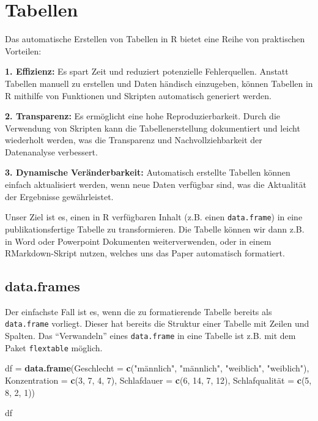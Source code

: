 \documentclass[
]{book}
\newenvironment{Shaded}{\begin{snugshade}}{\end{snugshade}}
\newcommand{\AttributeTok}[1]{\textcolor[rgb]{0.13,0.29,0.53}{#1}}
\newcommand{\DecValTok}[1]{\textcolor[rgb]{0.00,0.00,0.81}{#1}}
\newcommand{\FunctionTok}[1]{\textcolor[rgb]{0.13,0.29,0.53}{\textbf{#1}}}
\newcommand{\NormalTok}[1]{#1}
\newcommand{\OtherTok}[1]{\textcolor[rgb]{0.56,0.35,0.01}{#1}}
\newcommand{\StringTok}[1]{\textcolor[rgb]{0.31,0.60,0.02}{#1}}
\begin{document}
\chapter{Tabellen}\label{tabellen}

Das automatische Erstellen von Tabellen in R bietet eine Reihe von praktischen Vorteilen:

\textbf{1. Effizienz:} Es spart Zeit und reduziert potenzielle Fehlerquellen. Anstatt Tabellen manuell zu erstellen und Daten händisch einzugeben, können Tabellen in R mithilfe von Funktionen und Skripten automatisch generiert werden.

\textbf{2. Transparenz:} Es ermöglicht eine hohe Reproduzierbarkeit. Durch die Verwendung von Skripten kann die Tabellenerstellung dokumentiert und leicht wiederholt werden, was die Transparenz und Nachvollziehbarkeit der Datenanalyse verbessert.

\textbf{3. Dynamische Veränderbarkeit:} Automatisch erstellte Tabellen können einfach aktualisiert werden, wenn neue Daten verfügbar sind, was die Aktualität der Ergebnisse gewährleistet.

Unser Ziel ist es, einen in R verfügbaren Inhalt (z.B. einen \texttt{data.frame}) in eine publikationsfertige Tabelle zu transformieren. Die Tabelle können wir dann z.B. in Word oder Powerpoint Dokumenten weiterverwenden, oder in einem RMarkdown-Skript nutzen, welches uns das Paper automatisch formatiert.

\section{data.frames}\label{data.frames}

Der einfachste Fall ist es, wenn die zu formatierende Tabelle bereits als \texttt{data.frame} vorliegt. Dieser hat bereits die Struktur einer Tabelle mit Zeilen und Spalten. Das ``Verwandeln'' eines \texttt{data.frame} in eine Tabelle ist z.B. mit dem Paket \texttt{flextable} möglich.

\begin{Shaded}
\begin{Highlighting}[]
\NormalTok{df }\OtherTok{=} \FunctionTok{data.frame}\NormalTok{(}\AttributeTok{Geschlecht =} \FunctionTok{c}\NormalTok{(}\StringTok{"männlich"}\NormalTok{, }\StringTok{"männlich"}\NormalTok{, }\StringTok{"weiblich"}\NormalTok{, }\StringTok{"weiblich"}\NormalTok{),}
                \AttributeTok{Konzentration =} \FunctionTok{c}\NormalTok{(}\DecValTok{3}\NormalTok{, }\DecValTok{7}\NormalTok{, }\DecValTok{4}\NormalTok{, }\DecValTok{7}\NormalTok{),}
                \AttributeTok{Schlafdauer =} \FunctionTok{c}\NormalTok{(}\DecValTok{6}\NormalTok{, }\DecValTok{14}\NormalTok{, }\DecValTok{7}\NormalTok{, }\DecValTok{12}\NormalTok{),}
\NormalTok{                Schlafqualität }\OtherTok{=} \FunctionTok{c}\NormalTok{(}\DecValTok{5}\NormalTok{, }\DecValTok{8}\NormalTok{, }\DecValTok{2}\NormalTok{, }\DecValTok{1}\NormalTok{))}

\NormalTok{df}
\end{Highlighting}
\end{Shaded}
\end{document}
